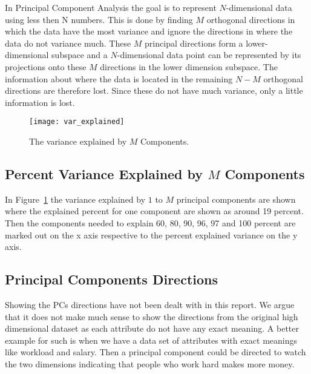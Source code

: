 
In Principal Component Analysis the goal is to represent $N$-dimensional data using less then N numbers. This is done by finding $M$ orthogonal directions in which the data have the most variance and ignore the directions in where the data do not variance much. These $M$ principal directions form a lower-dimensional subspace and a $N$-dimensional data point can be represented by its projections onto these $M$ directions in the lower dimension subspace. The information about where the data is located in the remaining $N-M$ orthogonal directions are therefore lost. Since these do not have much variance, only a little information is lost.

\begin{figure}[hbtp]
\centering
\texttt{[image: var\_explained]}
\caption{The variance explained by $M$ Components.\label{fig:pca_var_explained}}
\end{figure}

\subsection{Percent Variance Explained by $M$ Components}

In Figure~\ref{fig:pca_var_explained} the variance explained by $1$ to $M$ principal components are shown where the explained percent for one component are shown as around 19 percent. Then the components needed to explain 60, 80, 90, 96, 97 and 100 percent are marked out on the x axis respective to the percent explained variance on the y axis.

\subsection{Principal Components Directions}
Showing the PCs directions have not been dealt with in this report. We argue that it does not make much sense to show the directions from the original high dimensional dataset as each attribute do not have any exact meaning. A better example for such is when we have a data set of attributes with exact meanings like workload and salary. Then a principal component could be directed to watch the two dimensions indicating that people who work hard makes more money.


